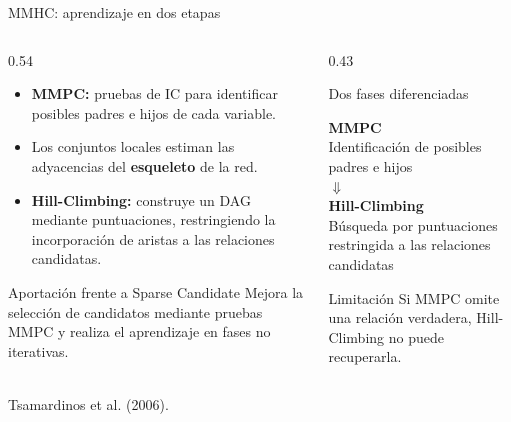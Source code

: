 \documentclass[aspectratio=169,11pt]{beamer}
\begin{document}
\begin{frame}[t]{MMHC: aprendizaje en dos etapas}
  \begin{columns}[T,onlytextwidth]
    \begin{column}{0.54\textwidth}
      \begin{itemize}
        \item \textbf{MMPC:} pruebas de IC para identificar
        posibles padres e hijos de cada variable.

        \item Los conjuntos locales estiman las adyacencias
        del \textbf{esqueleto} de la red.

        \item \textbf{Hill-Climbing:} construye un DAG
        mediante puntuaciones, restringiendo la incorporación
        de aristas a las relaciones candidatas.
      \end{itemize}

      \vspace{0.47cm}

      \begin{exampleblock}{Aportación frente a Sparse Candidate}
        \small
        Mejora la selección de candidatos mediante
        pruebas MMPC y realiza el aprendizaje en fases no iterativas.
      \end{exampleblock}

    \end{column}

    \begin{column}{0.43\textwidth}
      \begin{block}{Dos fases diferenciadas}
        \centering

        \textbf{MMPC}\\
        {\small Identificación de posibles padres e hijos}\\[0.12cm]

        $\Downarrow$\\[0.12cm]

        \textbf{Hill-Climbing}\\
        {\small Búsqueda por puntuaciones restringida
        a las relaciones candidatas}
      \end{block}

      \begin{alertblock}{Limitación}
        \small
        Si MMPC omite una relación verdadera,
        Hill-Climbing no puede recuperarla.
      \end{alertblock}
    \end{column}
  \end{columns}

  {\scriptsize\color{upmgray}Tsamardinos et al. (2006).}
\end{frame}
\end{document}
